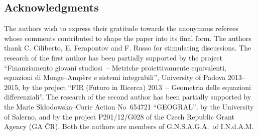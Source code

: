 \documentclass[10pt,a4paper]{amsart}
\numberwithin{equation}{section}
\begin{document}
\subsection*{Acknowledgments}
The authors wish to express their gratitude towards the anonymous referees whose comments contributed to shape the paper into its f\/inal form.
The authors thank C. Ciliberto, E. Ferapontov and F. Russo for stimulating discussions. The research of the f\/irst author has been partially supported by the project ``Finanziamento giovani studiosi~-- Metriche proiettivamente equiva\-lenti, equazioni di Monge--Amp\`ere e sistemi integrabili'', University of Padova 2013--2015, by the project ``FIR (Futuro in Ricerca) 2013~-- Geometria delle equazioni dif\/ferenziali''. The research of the second author has been partially supported by the Marie Sk{\l}odowska--Curie Action No~654721 ``GEOGRAL'', by the University of Salerno, and by the project P201/12/G028 of the Czech Republic Grant Agency (GA \v{C}R). Both the authors are members of G.N.S.A.G.A.\ of I.N.d.A.M.

\end{document}
